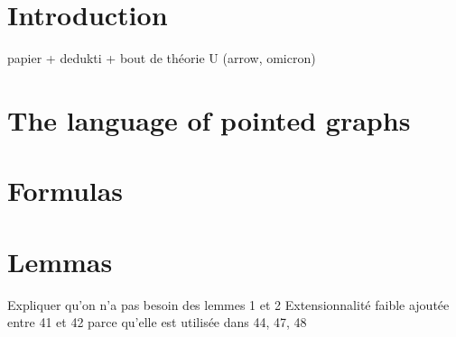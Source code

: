\documentclass[a4paper]{article}
\begin{document}
\section{Introduction}

papier + dedukti + bout de théorie U (arrow, omicron)

\section{The language of pointed graphs}


\section{Formulas}

\section{Lemmas}

Expliquer qu'on n'a pas besoin des lemmes 1 et 2
Extensionnalité faible ajoutée entre 41 et 42 parce qu'elle est utilisée dans 44, 47, 48 
\end{document}
